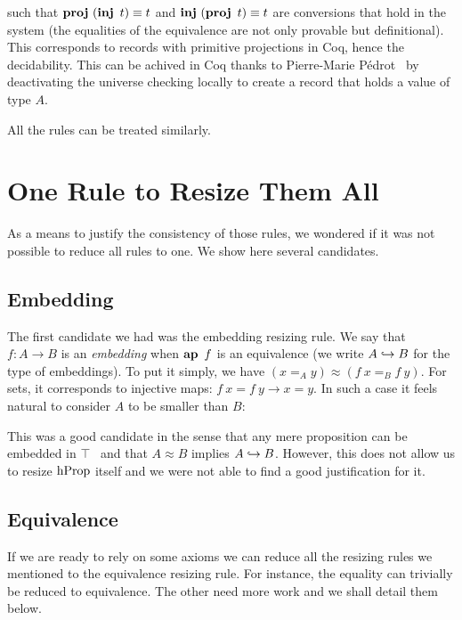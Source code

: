 \documentclass[11pt]{article}
\theoremstyle{plain}
\theoremstyle{remark}
\begin{document}
\begin{mathc}
  \qquad
\end{mathc}
%
\noindent
such that $\operatorname{\mathbf{proj}}\ (\operatorname{\mathbf{inj}}\ t) \equiv t$ and $\operatorname{\mathbf{inj}}\ (\operatorname{\mathbf{proj}}\ t) \equiv t$ are
conversions that hold in the system (the equalities of the equivalence are not
only provable but definitional).
This corresponds to records with primitive projections in Coq, hence the
decidability.
%
This can be achived in Coq thanks to Pierre-Marie Pédrot~\cite{pperdot:pr} by
deactivating the universe checking locally to create a record that holds a
value of type $A$.

All the rules can be treated similarly.


\section{One Rule to Resize Them All}

As a means to justify the consistency of those rules, we wondered if it was not
possible to reduce all rules to one. We show here several candidates.

\subsection{Embedding}
The first candidate we had was the embedding resizing rule.
We say that $f : A \to B$  is an \emph{embedding} when $\operatorname{\mathbf{ap}}\ f$ is an
equivalence (we write $A \hookrightarrow B$ for the type of embeddings).
To put it simply, we have $(x =_A y) \approx (f\ x =_B f\ y)$.
For sets, it corresponds to injective maps:
$f\ x = f\ y \to x = y$.
In such a case it feels natural to consider $A$ to be smaller than $B$:

\begin{mathc}
\end{mathc}

\noindent
This was a good candidate in the sense that any mere proposition can be embedded
in $\top$~ and that $A \approx B$ implies $A \hookrightarrow B$.
However, this does not allow us to resize $\operatorname{hProp}$ itself and we were not able
to find a good justification for it.

\subsection{Equivalence}
If we are ready to rely on some axioms we can reduce all the resizing rules we
mentioned to the equivalence resizing rule.
For instance, the equality can trivially be reduced to equivalence.
The other need more work and we shall detail them below.
\end{document}
